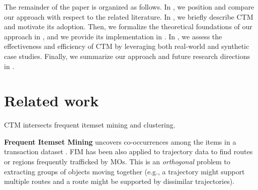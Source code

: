 \documentclass[preprint,12pt,authoryear]{elsarticle} %
\begin{document}
The remainder of the paper is organized as follows.
In , we position and compare our approach with respect to the related literature.
In , we briefly describe CTM and motivate its adoption.
Then, we formalize the theoretical foundations of our approach in , and we provide its implementation in .
In , we assess the effectiveness and efficiency of CTM by leveraging both real-world and synthetic case studies. 
Finally, we summarize our approach and future research directions in .


\section{Related work}\label{sec:related}

CTM intersects frequent itemset mining and clustering. 

\textbf{Frequent Itemset Mining} uncovers co-occurrences among the items in a transaction dataset \citep{DBLP:conf/vldb/AgrawalS94}. 
FIM has been also applied to trajectory data to find routes \citep{DBLP:conf/ideal/QiuP16,DBLP:journals/access/FuTXZ17} or regions \citep{zheng2018spatial} frequently trafficked by MOs.
This is an \textit{orthogonal} problem to extracting groups of objects moving together (e.g., a trajectory might support multiple routes and a route might be supported by dissimilar trajectories).
\end{document}
